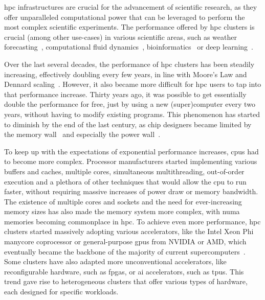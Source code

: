 \gls{hpc} infrastructures are crucial for the advancement of scientific
research, as they offer unparalleled computational power that can be leveraged to perform the most
complex scientific experiments. The performance offered by \gls{hpc} clusters is
crucial (among other use-cases) in various scientific areas, such as weather
forecasting~\cite{wrf}, computational fluid dynamics~\cite{cfd},
bioinformatics~\cite{bioinformatics} or deep learning~\cite{hpcdl}.

Over the last several decades, the performance of \gls{hpc} clusters has been steadily
increasing, effectively doubling every few years, in line with Moore's Law and Dennard
scaling~\cite{mooreslaw}. However, it also became more difficult for \gls{hpc}
users to tap into that performance increase. Thirty years ago, it was possible to get essentially
double the performance for free, just by using a new (super)computer every two years, without
having to modify existing programs. This phenomenon has started to diminish by the end of the last
century, as chip designers became limited by the memory wall~\cite{memorywall} and especially
the power wall~\cite{powerwall}.

To keep up with the expectations of exponential performance increases, \glspl{cpu} had
to become more complex. Processor manufacturers started implementing various buffers and caches,
multiple cores, simultaneous multithreading, out-of-order execution and a plethora of other
techniques that would allow the \gls{cpu} to run faster, without requiring massive
increases of power draw or memory bandwidth. The existence of multiple cores and sockets and the
need for ever-increasing memory sizes has also made the memory system more complex, with
\gls{numa} memories becoming commonplace in \gls{hpc}. To achieve even
more performance, \gls{hpc} clusters started massively adopting various accelerators,
like the Intel Xeon Phi~\cite{xeonphi} manycore coprocessor or general-purpose
\glspl{gpu} from NVIDIA or AMD, which eventually became the backbone of the majority of
current supercomputers~\cite{top500gpu}. Some clusters have also adapted more unconventional
accelerators, like reconfigurable hardware, such as \glspl{fpga}, or
\gls{ai} accelerators, such as \glspl{tpu}. This trend gave rise to
heterogeneous clusters that offer various types of hardware, each designed for specific workloads.


